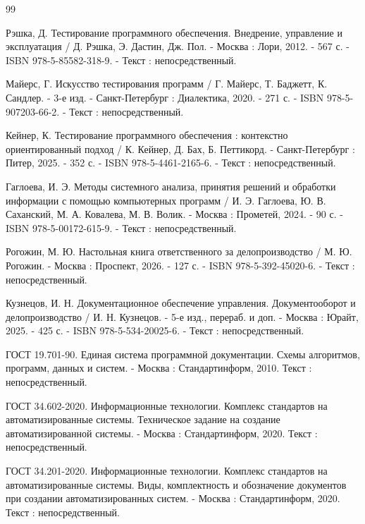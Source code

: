 \begin{thebibliography}{99}
	
	 Рэшка, Д. Тестирование программного обеспечения. Внедрение, управление и эксплуатация / Д. Рэшка, Э. Дастин, Дж. Пол. - Москва : Лори, 2012. - 567 с. - ISBN 978-5-85582-318-9. - Текст : непосредственный.
	
	 Майерс, Г. Искусство тестирования программ / Г. Майерс, Т. Баджетт, К. Сандлер. - 3-е изд. - Санкт-Петербург : Диалектика, 2020. - 271 с. - ISBN 978-5-907203-66-2. - Текст : непосредственный.
	
	 Кейнер, К. Тестирование программного обеспечения : контекстно ориентированный подход / К. Кейнер, Д. Бах, Б. Петтикорд. - Санкт-Петербург : Питер, 2025. - 352 с. - ISBN 978-5-4461-2165-6. - Текст : непосредственный.
	
	 Гаглоева, И. Э. Методы системного анализа, принятия решений и обработки информации с помощью компьютерных программ / И. Э. Гаглоева, Ю. В. Саханский, М. А. Ковалева, М. В. Волик. - Москва : Прометей, 2024. - 90 с. - ISBN 978-5-00172-615-9. - Текст : непосредственный.
	
	
	 Рогожин, М. Ю. Настольная книга ответственного за делопроизводство / М. Ю. Рогожин. - Москва : Проспект, 2026. - 127 с. - ISBN 978-5-392-45020-6. - Текст : непосредственный.
	
	 Кузнецов, И. Н. Документационное обеспечение управления. Документооборот и делопроизводство / И. Н. Кузнецов. - 5-е изд., перераб. и доп. - Москва : Юрайт, 2025. - 425 с. - ISBN 978-5-534-20025-6. - Текст : непосредственный.
	
	
	 ГОСТ 19.701-90. Единая система программной документации. Схемы алгоритмов, программ, данных и систем. - Москва : Стандартинформ, 2010. Текст : непосредственный.
	
	
	 ГОСТ 34.602-2020. Информационные технологии. Комплекс стандартов на автоматизированные системы. Техническое задание на создание автоматизированной системы. - Москва : Стандартинформ, 2020. Текст : непосредственный.
	
	
	 ГОСТ 34.201-2020. Информационные технологии. Комплекс стандартов на автоматизированные системы. Виды, комплектность и обозначение документов при создании автоматизированных систем. - Москва : Стандартинформ, 2020. Текст : непосредственный.
	

\end{thebibliography}
